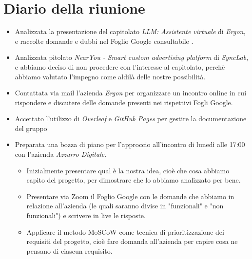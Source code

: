 \section{Diario della riunione}

\begin{itemize}
    \item Analizzata la presentazione del capitolato \emph{LLM: Assistente virtuale} di \emph{Ergon}, e raccolte domande e dubbi nel Foglio Google consultabile .
    
    \item Analizzata pitolato \emph{NearYou - Smart custom advertising platform} di \emph{SyncLab}, e abbiamo deciso di non procedere con l'interesse al capitolato, perchè abbiamo valutato l'impegno come aldilà delle nostre possibilità.
    
    \item Contattata via mail l'azienda \emph{Ergon} per organizzare un incontro online in cui rispondere e discutere delle domande presenti nei rispettivi Fogli Google.

    \item Accettato l'utilizzo di \emph{Overleaf} e \emph{GitHub Pages} per gestire la documentazione del gruppo

    \item Preparata una bozza di piano per l'approccio all'incontro di lunedì alle 17:00 con l'azienda \emph{Azzurro Digitale}. 
    \begin{itemize}
        \renewcommand{\labelitemii}{--}
        \item Inizialmente presentare qual è la nostra idea, cioè che cosa abbiamo capito del progetto, per dimostrare che lo abbiamo analizzato per bene.
        \item Presentare via Zoom il Foglio Google con le domande che abbiamo in relazione all'azienda (le quali saranno divise in "funzionali" e "non funzionali") e scrivere in live le risposte.
        \item Applicare il metodo MoSCoW come tecnica di prioritizzazione dei requisiti del progetto, cioè fare domanda all'azienda per capire cosa ne pensano di ciascun requisito.
    \end{itemize}
\end{itemize}